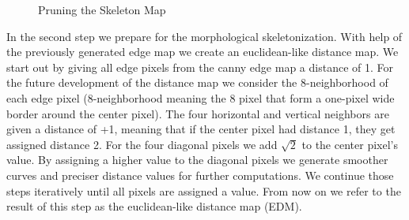 \documentclass[10pt,conference,compsocconf]{IEEEtran}
\begin{document}
\begin{figure}[tp]
	\centering
	\hspace{0.025\linewidth}
	\hspace{0.025\linewidth}
	\caption{Pruning the Skeleton Map}
\end{figure}

In the second step we prepare for the morphological skeletonization. With help of the previously generated edge map we create an euclidean-like distance map. We start out by giving all edge pixels from the canny edge map a distance of 1. For the future development of the distance map we consider the 8-neighborhood of each edge pixel (8-neighborhood meaning the 8 pixel that form a one-pixel wide border around the center pixel). The four horizontal and vertical neighbors are given a distance of +1, meaning that if the center pixel had distance 1, they get assigned distance 2. For the four diagonal pixels we add $\sqrt{2}$ to the center pixel's value. By assigning a higher value to the diagonal pixels we generate smoother curves and preciser distance values for further computations. We continue those steps iteratively until all pixels are assigned a value. From now on we refer to the result of this step as the euclidean-like distance map (EDM).
\end{document}
